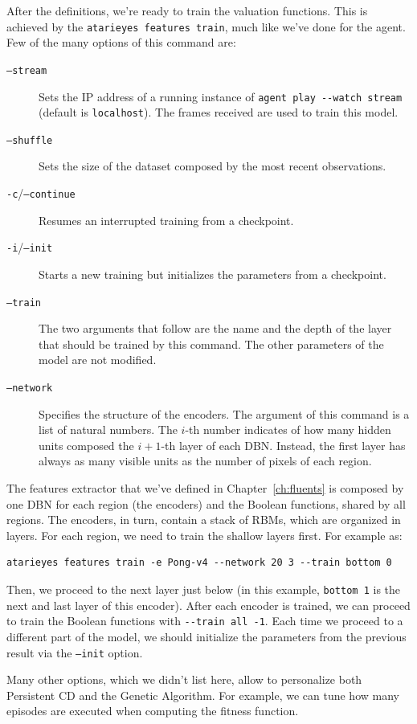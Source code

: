 After the definitions, we're ready to train the valuation functions.
This is achieved by the \verb|atarieyes features train|, much
like we've done for the agent. Few of the many options of this command are:
\begin{description}
	\item [\texttt{--stream}] Sets the IP address of a running instance of
		\verb|agent play --watch stream| (default is \texttt{localhost}). The
		frames received are used to train this model.
	\item [\texttt{--shuffle}] Sets the size of the dataset composed by the most
		recent observations.
	\item [\texttt{-c}/\texttt{--continue}] Resumes an interrupted training from 
		a checkpoint.
	\item [\texttt{-i}/\texttt{--init}] Starts a new training but initializes
		the parameters from a checkpoint.
	\item [\texttt{--train}] The two arguments that follow are the name and the
		depth of the layer that should be trained by this command. The other
		parameters of the model are not modified.
	\item [\texttt{--network}] Specifies the structure of the encoders. The
		argument of this command is a list of natural numbers. The $i$-th number
		indicates of how many hidden units composed the $i+1$-th layer of each
		DBN. Instead, the first layer has always as many visible units as the
		number of pixels of each region.
\end{description}
The features extractor that we've defined in Chapter~\ref{ch:fluents} is
composed by one DBN for each region (the encoders) and the Boolean functions,
shared by all regions. The encoders, in turn, contain a stack of RBMs, which
are organized in layers. For each region, we need to train the shallow layers
first. For example as:
\begin{verbatim}
atarieyes features train -e Pong-v4 --network 20 3 --train bottom 0
\end{verbatim}
Then, we proceed to the next layer just below (in this example,
\verb|bottom 1| is the next and last layer of this encoder). After each
encoder is trained, we can proceed to train the Boolean functions with
\verb|--train all -1|. Each time we proceed to a different part of the model,
we should initialize the parameters from the previous result via the
\texttt{--init} option.

Many other options, which we didn't list here, allow to personalize both
Persistent CD and the Genetic Algorithm. For example, we can tune how many
episodes are executed when computing the fitness function.

